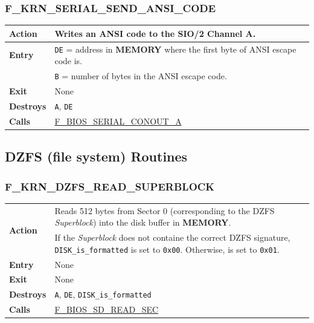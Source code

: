 \documentclass[a4paper,11pt]{article}
\begin{document}
        \subsubsection{F\_KRN\_SERIAL\_SEND\_ANSI\_CODE}
        \label{func:fkrnserialsendansicode}
        \begin{tabular}{l p{9cm}}
            \hline\textbf{Action}
            & Writes an ANSI code to the \textbf{SIO/2} Channel A. \\
            \hline\textbf{Entry}
            & \texttt{DE} = address in \textbf{MEMORY} where the first byte of
            ANSI escape code is.\\
            & \texttt{B} = number of bytes in the ANSI escape code.\\
            \hline\textbf{Exit} & None \\
            \hline\textbf{Destroys} & \texttt{A}, \texttt{DE} \\
            \hline\textbf{Calls}
            & \hyperref[func:fbiosserialconouta]{F\_BIOS\_SERIAL\_CONOUT\_A}\\
            \hline
        \end{tabular}

    \subsection{DZFS (file system) Routines}

        \subsubsection{F\_KRN\_DZFS\_READ\_SUPERBLOCK}
        \label{func:fkrndzfsreadsuperblock}
        \begin{tabular}{l p{9cm}}
            \hline\multirow[t]{2}{4em}{\textbf{Action}}
            & Reads 512 bytes from Sector 0 (corresponding to the DZFS 
            \textit{Superblock}) into the disk buffer in \textbf{MEMORY}.\\
            & If the \textit{Superblock} does not containe the correct DZFS
            signature, \texttt{DISK\_is\_formatted} is set to \texttt{0x00}. Otherwise, is
            set to \texttt{0x01}.\\
            \hline\textbf{Entry} & None \\
            \hline\textbf{Exit} & None \\
            \hline\textbf{Destroys} & \texttt{A}, \texttt{DE},
            \texttt{DISK\_is\_formatted} \\
            \hline\textbf{Calls}
            & \hyperref[func:fbiosdiskreadsec]{F\_BIOS\_SD\_READ\_SEC}\\
            \hline
        \end{tabular}
\end{document}
